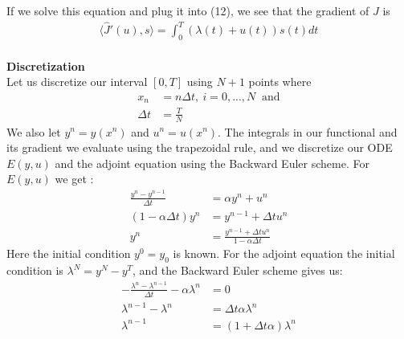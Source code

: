 \documentclass[11pt,a4paper]{report}
\begin{document}
If we solve this equation and plug it into (12), we see that the gradient of $J$ is 
\begin{align}
\langle\hat{J}'(u),s\rangle = \int_0^T (\lambda(t) +u(t))s(t)dt
\end{align}
\\
\textbf{Discretization}
\\
Let us discretize our interval $[0,T]$ using $N+1$ points where 
\begin{align}
x_n &= n\Delta t, \ i=0,...,N \ \text{ and} \\
\Delta t &= \frac{T}{N}
\end{align}
We also let $y^n = y(x^n)$ and $u^n=u(x^n)$. The integrals in our functional and its gradient we evaluate using the trapezoidal rule, and we discretize our ODE $E(y,u)$ and the adjoint equation using the Backward Euler scheme. For $E(y,u)$ we get :
\begin{align}
\frac{y^n-y^{n-1}}{\Delta t} &= \alpha y^{n} + u^{n} \\
(1-\alpha\Delta t)y^{n} &= y^{n-1} +\Delta t u^{n} \\
y^n &=\frac{y^{n-1} +\Delta t u^{n}}{1-\alpha\Delta t}
\end{align} 
Here the initial condition $y^0=y_0$ is known. For the adjoint equation the initial condition is $\lambda^N = y^N-y^T $, and the Backward Euler scheme gives us:
\begin{align}
-\frac{\lambda^n-\lambda^{n-1}}{\Delta t} -\alpha\lambda^n &=0 \\
\lambda^{n-1} -\lambda^n &=\Delta t\alpha \lambda^n \\
\lambda^{n-1} &= (1+\Delta t\alpha)\lambda^n
\end{align}
\end{document}
